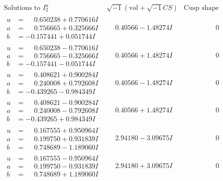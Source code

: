 \documentclass[1p]{elsarticle_modified}
\theoremstyle{definition}
\newcommand{\I}{\sqrt{-1}}
\begin{document}
$$\begin{array}{c|c|c}  
\text{Solutions to }I^u_{2}& \I (\text{vol} + \sqrt{-1}CS) & \text{Cusp shape}\\
 \hline 
\begin{aligned}
u &= \phantom{-}0.650238 + 0.770616 I \\
a &= \phantom{-}0.756665 + 0.325666 I \\
b &= -0.157441 + 0.051744 I\end{aligned}
 & \phantom{-}0.40566 - 1.48274 I & \phantom{-0.000000 } 0 \\ \hline\begin{aligned}
u &= \phantom{-}0.650238 - 0.770616 I \\
a &= \phantom{-}0.756665 - 0.325666 I \\
b &= -0.157441 - 0.051744 I\end{aligned}
 & \phantom{-}0.40566 + 1.48274 I & \phantom{-0.000000 } 0 \\ \hline\begin{aligned}
u &= \phantom{-}0.408621 + 0.900284 I \\
a &= \phantom{-}0.240008 + 0.792608 I \\
b &= -0.439265 - 0.984349 I\end{aligned}
 & \phantom{-}0.40566 - 1.48274 I & \phantom{-0.000000 } 0 \\ \hline\begin{aligned}
u &= \phantom{-}0.408621 - 0.900284 I \\
a &= \phantom{-}0.240008 - 0.792608 I \\
b &= -0.439265 + 0.984349 I\end{aligned}
 & \phantom{-}0.40566 + 1.48274 I & \phantom{-0.000000 } 0 \\ \hline\begin{aligned}
u &= \phantom{-}0.167555 + 0.950964 I \\
a &= \phantom{-}0.199750 + 0.931839 I \\
b &= \phantom{-}0.748689 - 1.189060 I\end{aligned}
 & \phantom{-}2.94180 - 3.09675 I & \phantom{-0.000000 } 0 \\ \hline\begin{aligned}
u &= \phantom{-}0.167555 - 0.950964 I \\
a &= \phantom{-}0.199750 - 0.931839 I \\
b &= \phantom{-}0.748689 + 1.189060 I\end{aligned}
 & \phantom{-}2.94180 + 3.09675 I & \phantom{-0.000000 } 0 \\ \hline\begin{aligned}

\end{aligned}
\end{array}$$
\end{document}
